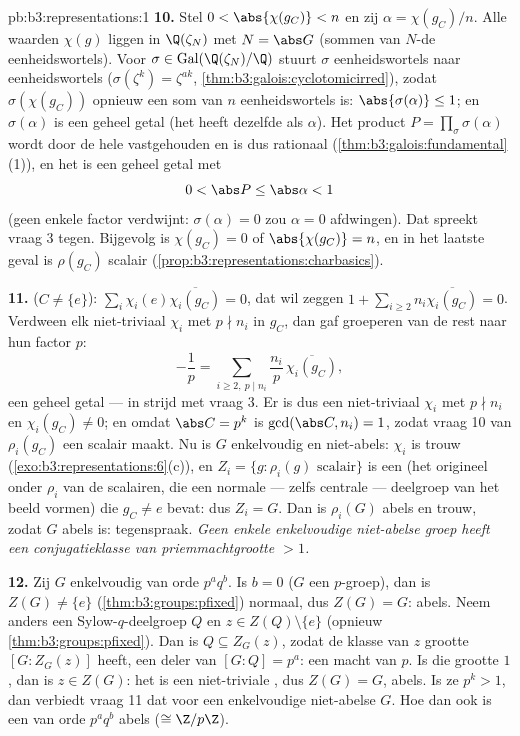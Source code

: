 \begin{solution}{pb:b3:representations:1}
\textbf{10.} Stel $0 < \abs{\chi(g_C)} < n$ en zij $\alpha =
\chi(g_C)/n$. Alle waarden $\chi(g)$ liggen in $\Q(\zeta_N)$ met
$N = \abs G$ (sommen van $N$-de eenheidswortels). Voor $\sigma \in
\operatorname{Gal}(\Q(\zeta_N)/\Q)$ stuurt $\sigma$
eenheidswortels naar eenheidswortels ($\sigma(\zeta^k) =
\zeta^{ak}$, \cref{thm:b3:galois:cyclotomicirred}), zodat
$\sigma(\chi(g_C))$ opnieuw een som van $n$ eenheidswortels is:
$\abs{\sigma(\alpha)} \leq 1$; en $\sigma(\alpha)$ is een geheel
 getal (het heeft dezelfde  als
$\alpha$). Het product $P = \prod_\sigma \sigma(\alpha)$ wordt
door de hele  vastgehouden en is dus rationaal
(\cref{thm:b3:galois:fundamental}(1)), en het is een geheel
 getal met
\[
0 < \abs P \leq \abs\alpha < 1
\]
(geen enkele factor verdwijnt: $\sigma(\alpha) = 0$ zou $\alpha =
0$ afdwingen). Dat spreekt vraag 3 tegen. Bijgevolg is $\chi(g_C)
= 0$ of $\abs{\chi(g_C)} = n$, en in het laatste geval is
$\rho(g_C)$ scalair
(\cref{prop:b3:representations:charbasics}).

\textbf{11.}  ($C \neq \{e\}$): $\sum_i
\chi_i(e)\overline{\chi_i(g_C)} = 0$, dat wil zeggen $1 + \sum_{i
\geq 2} n_i\overline{\chi_i(g_C)} = 0$. Verdween elk
niet-triviaal $\chi_i$ met $p \nmid n_i$ in $g_C$, dan gaf
groeperen van de rest naar hun factor $p$:
\[
-\frac1p = \sum_{i \geq 2,\ p \mid n_i}
\frac{n_i}{p}\,\overline{\chi_i(g_C)},
\]
een geheel  getal --- in strijd met vraag 3. Er is dus
een niet-triviaal $\chi_i$ met $p \nmid n_i$ en $\chi_i(g_C) \neq
0$; en omdat $\abs C = p^k$ is $\gcd(\abs C, n_i) = 1$, zodat
vraag 10 van $\rho_i(g_C)$ een scalair maakt. Nu is $G$
enkelvoudig en niet-abels: $\chi_i$ is trouw
(\cref{exo:b3:representations:6}(c)), en $Z_i = \{g : \rho_i(g)
\text{ scalair}\}$ is een  (het origineel onder
$\rho_i$ van de scalairen, die een normale --- zelfs centrale ---
deelgroep van het beeld vormen) die $g_C \neq e$ bevat: dus $Z_i =
G$. Dan is $\rho_i(G)$ abels en trouw, zodat $G$ abels is:
tegenspraak. \emph{Geen enkele enkelvoudige niet-abelse groep
heeft een conjugatieklasse van priemmachtgrootte $> 1$.}

\textbf{12.} Zij $G$ enkelvoudig van orde $p^aq^b$. Is $b = 0$
($G$ een $p$-groep), dan is $Z(G) \neq \{e\}$
(\cref{thm:b3:groups:pfixed}) normaal, dus $Z(G) = G$: abels.
Neem anders een Sylow-$q$-deelgroep $Q$ en $z \in Z(Q)
\setminus\{e\}$ (opnieuw \cref{thm:b3:groups:pfixed}). Dan is $Q
\subseteq Z_G(z)$, zodat de klasse van $z$ grootte $[G : Z_G(z)]$
heeft, een deler van $[G : Q] = p^a$: een macht van $p$. Is die
grootte $1$, dan is $z \in Z(G)$: het  is een
niet-triviale , dus $Z(G) = G$, abels. Is ze $p^k >
1$, dan verbiedt vraag 11 dat voor een enkelvoudige niet-abelse
$G$. Hoe dan ook is een  van orde $p^aq^b$
abels ($\cong \Z/p\Z$).


\end{solution}

